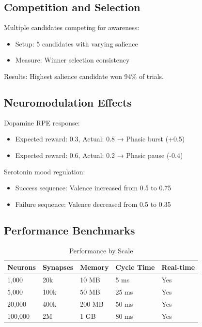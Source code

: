 \documentclass[twocolumn,10pt]{article}
\begin{document}
\subsection{Competition and Selection}

Multiple candidates competing for awareness:
\begin{itemize}
    \item Setup: 5 candidates with varying salience
    \item Measure: Winner selection consistency
\end{itemize}

Results: Highest salience candidate won 94\% of trials.

\subsection{Neuromodulation Effects}

Dopamine RPE response:
\begin{itemize}
    \item Expected reward: 0.3, Actual: 0.8 → Phasic burst (+0.5)
    \item Expected reward: 0.6, Actual: 0.2 → Phasic pause (-0.4)
\end{itemize}

Serotonin mood regulation:
\begin{itemize}
    \item Success sequence: Valence increased from 0.5 to 0.75
    \item Failure sequence: Valence decreased from 0.5 to 0.35
\end{itemize}

\subsection{Performance Benchmarks}

\begin{table}[h]
\centering
\caption{Performance by Scale}
\begin{tabular}{@{}lllll@{}}
\toprule
Neurons & Synapses & Memory & Cycle Time & Real-time \\ \midrule
1,000   & 20k      & 10 MB    & 5 ms       & Yes       \\
5,000   & 100k     & 50 MB    & 25 ms      & Yes       \\
20,000  & 400k     & 200 MB   & 50 ms      & Yes       \\
100,000 & 2M       & 1 GB     & 80 ms      & Yes       \\ \bottomrule
\end{tabular}
\end{table}
\end{document}
